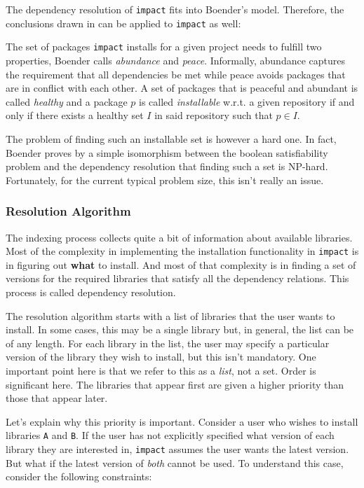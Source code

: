 \documentclass[11pt,a4paper,twocolumn]{article}
\newcommand{\code}[1]{\texttt{#1}} %
\begin{document}
The dependency resolution of \code{impact} fits into Boender's model.
Therefore, the conclusions drawn in \parencite{boender2011formal} can be
applied to \code{impact} as well:

The set of packages \code{impact} installs for a given project needs to
fulfill two properties, Boender calls \emph{abundance} and \emph{peace}.
Informally, abundance captures the requirement that all dependencies
be met while peace avoids packages that are in conflict with each
other.  A set of packages that is peaceful and abundant is called {\em
  healthy} and a package $p$ is called \emph{installable} w.r.t. a
given repository if and only if there exists a healthy set $I$ in said
repository such that $p \in I$.

The problem of finding such an installable set is however a hard one.
In fact, Boender proves by a simple isomorphism between the boolean
satisfiability problem and the dependency resolution that finding such
a set is NP-hard.  Fortunately, for the current typical problem size,
this isn't really an issue.

\subsubsection{Resolution Algorithm}

The indexing process collects quite a bit of information about
available libraries.  Most of the complexity in implementing the
installation functionality in \code{impact} is in figuring out
\textbf{what} to install.  And most of that complexity is in finding a set
of versions for the required libraries that satisfy all the dependency
relations.  This process is called dependency resolution.

The resolution algorithm starts with a list of libraries that the user
wants to install.  In some cases, this may be a single library but, in
general, the list can be of any length.  For each library in the list,
the user may specify a particular version of the library they wish to
install, but this isn't mandatory.  One important point here is that
we refer to this as a \emph{list}, not a set.  Order is significant
here.  The libraries that appear first are given a higher priority
than those that appear later.

Let's explain why this priority is important.  Consider a user who
wishes to install libraries \code{A} and \code{B}.  If the user has
not explicitly specified what version of each library they are
interested in, \code{impact} assumes the user wants the latest
version.  But what if the latest version of \emph{both} cannot be
used.  To understand this case, consider the following constraints:
\end{document}

